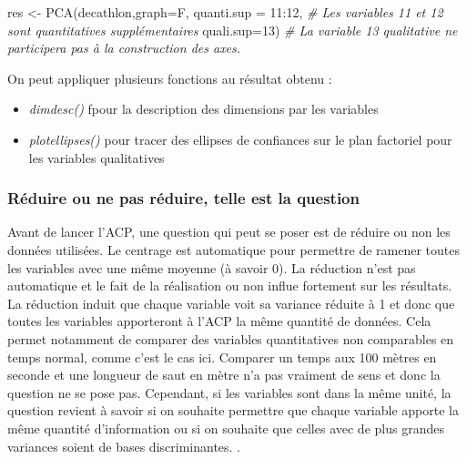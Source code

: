 \documentclass[
]{article}
\newenvironment{Shaded}{\begin{snugshade}}{\end{snugshade}}
\newcommand{\AttributeTok}[1]{\textcolor[rgb]{0.77,0.63,0.00}{#1}}
\newcommand{\CommentTok}[1]{\textcolor[rgb]{0.56,0.35,0.01}{\textit{#1}}}
\newcommand{\DecValTok}[1]{\textcolor[rgb]{0.00,0.00,0.81}{#1}}
\newcommand{\FunctionTok}[1]{\textcolor[rgb]{0.00,0.00,0.00}{#1}}
\newcommand{\NormalTok}[1]{#1}
\newcommand{\OtherTok}[1]{\textcolor[rgb]{0.56,0.35,0.01}{#1}}
\newcommand{\SpecialCharTok}[1]{\textcolor[rgb]{0.00,0.00,0.00}{#1}}
\providecommand{\tightlist}{%
  \setlength{\itemsep}{0pt}\setlength{\parskip}{0pt}}
\begin{document}
\begin{Shaded}
\begin{Highlighting}[]
\NormalTok{res }\OtherTok{\textless{}{-}} \FunctionTok{PCA}\NormalTok{(decathlon,}\AttributeTok{graph=}\NormalTok{F, }
           \AttributeTok{quanti.sup =} \DecValTok{11}\SpecialCharTok{:}\DecValTok{12}\NormalTok{, }\CommentTok{\# Les variables 11 et 12 sont quantitatives supplémentaires}
           \AttributeTok{quali.sup=}\DecValTok{13}\NormalTok{) }\CommentTok{\# La variable 13  qualitative ne participera pas à la construction des axes.}
\end{Highlighting}
\end{Shaded}

On peut appliquer plusieurs fonctions au résultat obtenu :

\begin{itemize}
\tightlist
\item
  \emph{dimdesc()} fpour la description des dimensions par les variables
\item
  \emph{plotellipses()} pour tracer des ellipses de confiances sur le
  plan factoriel pour les variables qualitatives
\end{itemize}

\hypertarget{ruxe9duire-ou-ne-pas-ruxe9duire-telle-est-la-question}{%
\subsubsection{Réduire ou ne pas réduire, telle est la
question}\label{ruxe9duire-ou-ne-pas-ruxe9duire-telle-est-la-question}}

Avant de lancer l'ACP, une question qui peut se poser est de réduire ou
non les données utilisées. Le centrage est automatique pour permettre de
ramener toutes les variables avec une même moyenne (à savoir 0). La
réduction n'est pas automatique et le fait de la réalisation ou non
influe fortement sur les résultats. La réduction induit que chaque
variable voit sa variance réduite à 1 et donc que toutes les variables
apporteront à l'ACP la même quantité de données. Cela permet notamment
de comparer des variables quantitatives non comparables en temps normal,
comme c'est le cas ici. Comparer un temps aux 100 mètres en seconde et
une longueur de saut en mètre n'a pas vraiment de sens et donc la
question ne se pose pas. Cependant, si les variables sont dans la même
unité, la question revient à savoir si on souhaite permettre que chaque
variable apporte la même quantité d'information ou si on souhaite que
celles avec de plus grandes variances soient de bases discriminantes. .
\end{document}
